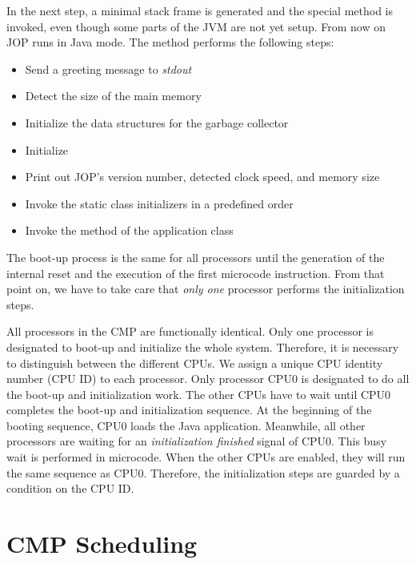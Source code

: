 In the next step, a minimal stack frame is generated and the special
method  is invoked, even though some parts of
the JVM are not yet setup. From now on JOP runs in Java mode. The
method  performs the following steps:
\begin{samepage}
\begin{itemize}
    \item Send a greeting message to \emph{stdout}
    \item Detect the size of the main memory
    \item Initialize the data structures for the garbage
        collector
    \item Initialize 
    \item Print out JOP's version number, detected clock speed,
        and memory size
    \item Invoke the static class initializers in a predefined
        order
    \item Invoke the  method of the application class
\end{itemize}
\end{samepage}

The boot-up process is the same for all processors until the
generation of the internal reset and the execution of the first
microcode instruction. From that point on, we have to take care that
\emph{only one} processor performs the initialization steps.

All processors in the CMP are functionally identical. Only one
processor is designated to boot-up and initialize the whole system.
Therefore, it is necessary to distinguish between the different CPUs.
We assign a unique CPU identity number (CPU ID) to each processor.
Only processor CPU0 is designated to do all the boot-up and
initialization work. The other CPUs have to wait until CPU0 completes
the boot-up and initialization sequence. At the beginning of the
booting sequence, CPU0 loads the Java application. Meanwhile, all
other processors are waiting for an \emph{initialization finished}
signal of CPU0. This busy wait is performed in microcode. When the
other CPUs are enabled, they will run the same sequence as CPU0.
Therefore, the initialization steps are guarded by a condition on the
CPU ID.

\section{CMP Scheduling}

